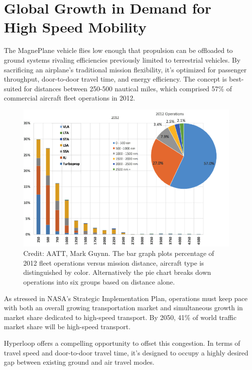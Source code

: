 \documentclass[heading.tex]{subfiles}
\begin{document}
\section{Global Growth in Demand for High Speed Mobility}
\label{s:demand}

The MagnePlane vehicle flies low enough that propulsion can be offloaded to
ground systems rivaling efficiencies previously limited to terrestrial
vehicles. By sacrificing an airplane’s traditional mission flexibility,
it’s optimized for passenger throughput, door-to-door travel time, and energy
efficiency.
The concept is best-suited for distances between 250-500 nautical miles,
which comprised 57\% of commercial aircraft fleet operations in 2012.

\begin{figure}[H]
\centering
\includegraphics[width=.75\textwidth]{images/Pie.png}
 \caption[FleetOps]{Credit: AATT, Mark Guynn. The bar graph plots percentage of 2012 fleet operations versus mission distance, aircraft type is distinguished by color. Alternatively the pie chart breaks down operations into six groups based on distance alone.}
\label{f:fleetOps}
\end{figure}

As stressed in NASA's Strategic Implementation Plan, operations must keep pace
with both an overall growing transportation market and simultaneous growth in
market share dedicated to high-speed transport. By 2050, 41\% of world traffic
market share will be high-speed transport. \cite{Schafer}

Hyperloop offers a compelling opportunity to offset this congestion. In terms of travel speed and door-to-door travel time, it's designed to occupy a highly desired gap between existing ground and air travel modes.
\end{document}
